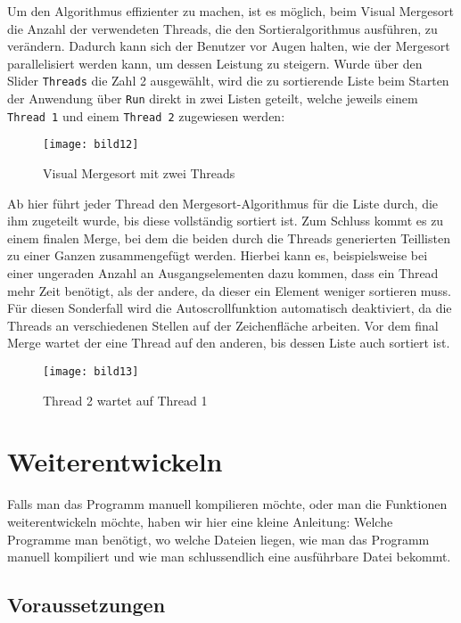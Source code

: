 Um den Algorithmus effizienter zu machen, ist es möglich, beim Visual Mergesort die Anzahl der verwendeten Threads, die den Sortieralgorithmus ausführen, zu verändern. Dadurch kann sich der Benutzer vor Augen halten, wie der Mergesort parallelisiert werden kann, um dessen Leistung zu steigern. Wurde über den Slider \texttt{Threads} die Zahl 2 ausgewählt, wird die zu sortierende Liste beim Starten der Anwendung über \texttt{Run} direkt in zwei Listen geteilt, welche jeweils einem \texttt{Thread 1} und einem \texttt{Thread 2} zugewiesen werden:

\begin{figure}[!htb]
    \centering
      \texttt{[image: bild12]}
    \caption{Visual Mergesort mit zwei Threads}
\end{figure}

Ab hier führt jeder Thread den Mergesort-Algorithmus für die Liste durch, die ihm zugeteilt wurde, bis diese vollständig sortiert ist. Zum Schluss kommt es zu einem finalen Merge, bei dem die beiden durch die Threads generierten Teillisten zu einer Ganzen zusammengefügt werden. Hierbei kann es, beispielsweise bei einer ungeraden Anzahl an Ausgangselementen dazu kommen, dass ein Thread mehr Zeit benötigt, als der andere, da dieser ein Element weniger sortieren muss. Für diesen Sonderfall wird die Autoscrollfunktion automatisch deaktiviert, da die Threads an verschiedenen Stellen auf der Zeichenfläche arbeiten. Vor dem final Merge wartet der eine Thread auf den anderen, bis dessen Liste auch sortiert ist.

\begin{figure}[!htb]
    \centering
      \texttt{[image: bild13]}
    \caption{Thread 2 wartet auf Thread 1}
\end{figure}

\clearpage
\section{Weiterentwickeln}

Falls man das Programm manuell kompilieren möchte, oder man die Funktionen weiterentwickeln möchte, haben wir hier eine kleine Anleitung: Welche Programme man benötigt, wo welche Dateien liegen, wie man das Programm manuell kompiliert und wie man schlussendlich eine ausführbare Datei bekommt.

\subsection{Voraussetzungen}

